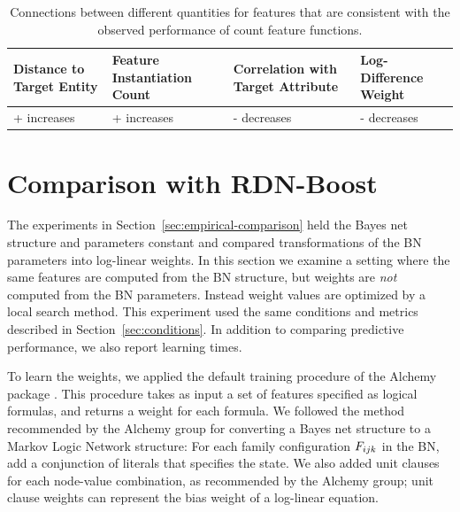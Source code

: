 \documentclass[twoside,11pt]{article}
\begin{document}
\begin{table}[htdp]
\caption{Connections between different quantities for features that are consistent with the observed performance of count feature functions. 
}
\begin{center}
\begin{tabular}{|p{3cm}|p{3cm}p{3cm}p{3cm}|}
Distance to Target Entity & Feature Instantiation Count & Correlation with Target Attribute & Log-Difference Weight \\\hline
+ increases & + increases & - decreases & - decreases
\end{tabular}
\end{center}
\label{table:heuristic}
\end{table}%




\section{Comparison with RDN-Boost}
\label{sec:general-weights}

The experiments in Section~\ref{sec:empirical-comparison} held the Bayes net structure and parameters constant and compared transformations of the BN parameters into log-linear weights. In this section we examine a setting where the same features are computed from the BN structure, but weights are {\em not} computed from the BN parameters. Instead weight values are optimized by a local search method. This experiment used the same conditions and metrics described in Section~\ref{sec:conditions}.  In addition to comparing predictive performance, we also report learning times.

To learn the weights, we applied the default training procedure of the Alchemy package \cite{Kok2009a}.  This procedure takes as input a set of features specified as logical formulas, and returns a weight for each formula. We followed the method recommended by the Alchemy group \cite{bib:bayes-convert} for converting a Bayes net structure to a Markov Logic Network structure: For each family configuration $F_{ijk}$ in the BN, add a conjunction of literals that specifies the state. We also added unit clauses for each node-value combination, as recommended by the Alchemy group; unit clause weights can represent the bias weight of a log-linear equation.
\end{document}
